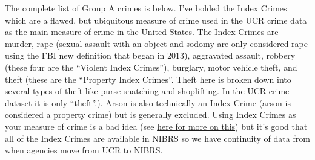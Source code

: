 \documentclass[
  12pt,
  openany]{book}
\begin{document}
The complete list of Group A crimes is below. I've bolded the Index Crimes which are a flawed, but ubiquitous measure of crime used in the UCR crime data as the main measure of crime in the United States. The Index Crimes are murder, rape (sexual assault with an object and sodomy are only considered rape using the FBI new definition that began in 2013), aggravated assault, robbery (these four are the ``Violent Index Crimes''), burglary, motor vehicle theft, and theft (these are the ``Property Index Crimes''. Theft here is broken down into several types of theft like purse-snatching and shoplifting. In the UCR crime dataset it is only ``theft''.). Arson is also technically an Index Crime (arson is considered a property crime) but is generally excluded. Using Index Crimes as your measure of crime is a bad idea (see \href{https://www.propublica.org/article/the-secret-irs-files-trove-of-never-before-seen-records-reveal-how-the-wealthiest-avoid-income-tax}{here for more on this}) but it's good that all of the Index Crimes are available in NIBRS so we have continuity of data from when agencies move from UCR to NIBRS.
\end{document}

